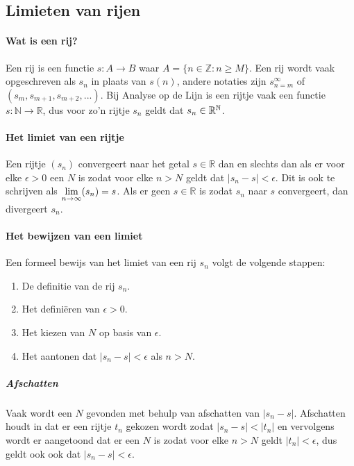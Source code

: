 \subsection{Limieten van rijen}
\paragraph{Wat is een rij?} Een rij is een functie $s:A \to B$ waar $A=\{n\in\mathbb{Z}:n \geq M\}$. Een rij wordt vaak opgeschreven als $s_{n}$ in plaats van $s(n)$, andere notaties zijn $s_{n=m}^{\infty}$ of $(s_{m},s_{m+1},s_{m+2},...)$. Bij Analyse op de Lijn is een rijtje vaak een functie $s:\mathbb{N}\to\mathbb{R}$, dus voor zo'n  rijtje $s_{n}$ geldt dat $s_{n}\in\mathbb{R}^{\mathbb{N}}$.

\paragraph{Het limiet van een rijtje} Een rijtje $(s_{n})$ convergeert naar het getal $s\in\mathbb{R}$ dan en slechts dan als er voor elke $\epsilon>0$ een $N$ is zodat voor elke $n>N$ geldt dat $|s_{n}-s|<\epsilon$. Dit is ook te schrijven als $\underset{n\to\infty}{\text{lim}}(s_{n})=s$. Als er geen $s\in\mathbb{R}$ is zodat $s_{n}$ naar $s$ convergeert, dan divergeert $s_{n}$.

\paragraph{Het bewijzen van een limiet} Een formeel bewijs van het limiet van een rij $s_{n}$ volgt de volgende stappen:
\begin{enumerate}
    \setlength\itemsep{0em}
    \item De definitie van de rij $s_{n}$.
    \item Het definiëren van $\epsilon>0$.
    \item Het kiezen van $N$ op basis van $\epsilon$.
    \item Het aantonen dat $|s_{n}-s|<\epsilon$ als $n>N$.
\end{enumerate}
\subparagraph{Afschatten} \label{sec:afschatten}Vaak wordt een $N$ gevonden met behulp van afschatten van $|s_{n}-s|$. Afschatten houdt in dat er een rijtje $t_{n}$ gekozen wordt zodat $|s_{n}-s|<|t_{n}|$ en vervolgens wordt er aangetoond dat er een $N$ is zodat voor elke $n>N$ geldt $|t_{n}|<\epsilon$, dus geldt ook ook dat $|s_{n}-s|<\epsilon$. \bigskip

